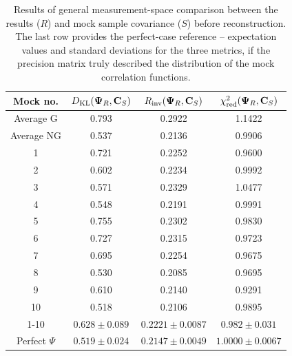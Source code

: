 \begin{table}
\centering
\begin{tabular}{|c|c|c|c|}
\hline
Mock no. & $D_{\rm KL} {\left( {\bf \Psi}_R, {\bf C}_S \right)}$ & $R_{\rm inv} {\left( {\bf \Psi}_R, {\bf C}_S \right)}$ & $\chi^2_{\rm red} {\left( {\bf \Psi}_R, {\bf C}_S \right)}$ \\
\hline
Average G & 0.793 & 0.2922 & 1.1422 \\
Average NG & 0.537 & 0.2136 & 0.9906 \\
\hline
1 & 0.721 & 0.2252 & 0.9600 \\
2 & 0.602 & 0.2234 & 0.9992 \\
3 & 0.571 & 0.2329 & 1.0477 \\
4 & 0.548 & 0.2191 & 0.9991 \\
5 & 0.755 & 0.2302 & 0.9830 \\
6 & 0.727 & 0.2315 & 0.9723 \\
7 & 0.695 & 0.2254 & 0.9675 \\
8 & 0.530 & 0.2085 & 0.9695 \\
9 & 0.610 & 0.2140 & 0.9291 \\
10 & 0.518 & 0.2106 & 0.9895 \\
\hline
1-10 & $0.628 \pm 0.089$ & $0.2221 \pm 0.0087$ & $0.982 \pm 0.031$ \\
\hline
Perfect $\Psi$ & $0.519 \pm 0.024$ & $0.2147 \pm 0.0049$ & $1.0000 \pm 0.0067$ \\
\hline
\end{tabular}
\caption[General (measurement-space) comparison between \rascalc{} and sample covariance for \desimtwo{} mocks before reconstruction]{Results of general measurement-space comparison between the \rascalc{} results ($R$) and mock sample covariance ($S$) before reconstruction.
The last row provides the perfect-case reference -- expectation values and standard deviations for the three metrics, if the \rascalc{} precision matrix truly described the distribution of the mock correlation functions.
}
\label{tab:comparison-measurement-pre}
\end{table}

